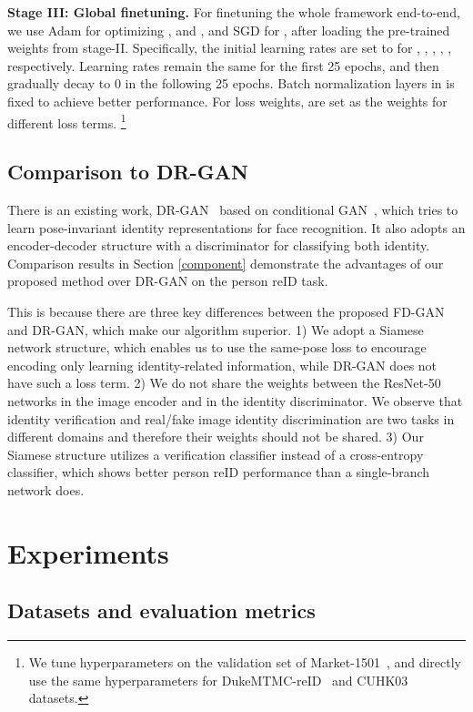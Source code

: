 \documentclass{article}
\begin{document}
\textbf{Stage III: Global finetuning.}
For finetuning the whole framework end-to-end, we use Adam for optimizing ,  and , and SGD for ,  after loading the pre-trained weights from stage-II.
Specifically, the initial learning rates are set to  for , , , , , respectively. 
Learning rates remain the same for the first 25 epochs, and then gradually decay to 0 in the following 25 epochs.
Batch normalization layers in  is fixed to achieve better performance.
For loss weights,  are set as the weights for different loss terms. \footnote{We tune hyperparameters on the validation set of Market-1501~\cite{market}, and directly use the same hyperparameters for DukeMTMC-reID~\cite{duke} and CUHK03~\cite{cuhk} datasets.}


\subsection{Comparison to DR-GAN~\cite{tran2017disentangled}}

There is an existing work, DR-GAN~\cite{tran2017disentangled} based on conditional GAN~\cite{mirza2014conditional}, which tries to learn pose-invariant identity representations for face recognition. It also adopts an encoder-decoder structure with a discriminator for classifying both identity. Comparison results in Section \ref{component} demonstrate the advantages of our proposed method over DR-GAN on the person reID task.

This is because there are three key differences between the proposed FD-GAN and DR-GAN, which make our algorithm superior. 1) We adopt a Siamese network structure, which enables us to use the same-pose loss to encourage encoding only learning identity-related information, while DR-GAN does not have such a loss term. 2) We do not share the weights between the ResNet-50 networks in the image encoder and in the identity discriminator. We observe that identity verification and real/fake image identity discrimination are two tasks in different domains and therefore their weights should not be shared. 3) Our Siamese structure utilizes a verification classifier instead of a cross-entropy classifier, which shows better person reID performance than a single-branch network does. 

\section{Experiments}
\subsection{Datasets and evaluation metrics}
\end{document}
